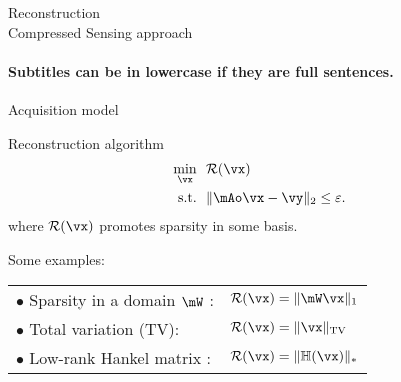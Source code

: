 \begin{frame}{Reconstruction\\[-3mm] {\normalsize Compressed Sensing approach}}
 \framesubtitle{Subtitles can be in lowercase if they are full sentences.}
 \begin{block}{Acquisition model}
\centering
 \end{block}
\begin{block}{Reconstruction algorithm}
\vspace{-.7cm}
\begin{align*}
\min_\vx~&~\mathcal{R}(\vx) \\
\textrm{s.t.}~&~\|\mAo \vx-\vy\|_2 \leq \varepsilon.
\end{align*}
where $\mathcal{R}(\vx)$ promotes sparsity in some basis.
\end{block}

Some examples:

\begin{tabular}{ll}
\quad$\bullet$ Sparsity in a domain $\mW$ \parencite{lustig2007sparse}:&$\mathcal{R}(\vx) = \|\mW\vx\|_1$ \\
\quad$\bullet$ Total variation (TV): &$\mathcal{R}(\vx) = \|\vx\|_{\textrm{TV}}$\\
\quad$\bullet$ Low-rank Hankel matrix \parencite{jin2016general}: &$\mathcal{R}(\vx) = \|\mathbb{H}(\vx)\|_*$

\end{tabular}


\vspace{10cm}
\end{frame}

